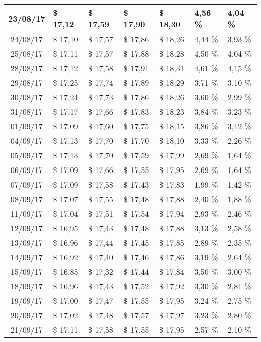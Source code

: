 \begin{center}
\begin{longtable}{|c|p{1.5cm}|p{1.5cm}|p{1.5cm}|p{1.5cm}|p{1.5cm}|p{1.5cm}|}
23/08/17 & \$ 17,12 & \$ 17,59 & \$ 17,90 & \$ 18,30 & 4,56 \% & 4,04 \% \\ \hline
24/08/17 & \$ 17,10 & \$ 17,57 & \$ 17,86 & \$ 18,26 & 4,44 \% & 3,93 \% \\ \hline
25/08/17 & \$ 17,11 & \$ 17,57 & \$ 17,88 & \$ 18,28 & 4,50 \% & 4,04 \% \\ \hline
28/08/17 & \$ 17,12 & \$ 17,58 & \$ 17,91 & \$ 18,31 & 4,61 \% & 4,15 \% \\ \hline
29/08/17 & \$ 17,25 & \$ 17,74 & \$ 17,89 & \$ 18,29 & 3,71 \% & 3,10 \% \\ \hline
30/08/17 & \$ 17,24 & \$ 17,73 & \$ 17,86 & \$ 18,26 & 3,60 \% & 2,99 \% \\ \hline
31/08/17 & \$ 17,17 & \$ 17,66 & \$ 17,83 & \$ 18,23 & 3,84 \% & 3,23 \% \\ \hline
01/09/17 & \$ 17,09 & \$ 17,60 & \$ 17,75 & \$ 18,15 & 3,86 \% & 3,12 \% \\ \hline
04/09/17 & \$ 17,13 & \$ 17,70 & \$ 17,70 & \$ 18,10 & 3,33 \% & 2,26 \% \\ \hline
05/09/17 & \$ 17,13 & \$ 17,70 & \$ 17,59 & \$ 17,99 & 2,69 \% & 1,64 \% \\ \hline
06/09/17 & \$ 17,09 & \$ 17,66 & \$ 17,55 & \$ 17,95 & 2,69 \% & 1,64 \% \\ \hline
07/09/17 & \$ 17,09 & \$ 17,58 & \$ 17,43 & \$ 17,83 & 1,99 \% & 1,42 \% \\ \hline
08/09/17 & \$ 17,07 & \$ 17,55 & \$ 17,48 & \$ 17,88 & 2,40 \% & 1,88 \% \\ \hline
11/09/17 & \$ 17,04 & \$ 17,51 & \$ 17,54 & \$ 17,94 & 2,93 \% & 2,46 \% \\ \hline
12/09/17 & \$ 16,95 & \$ 17,43 & \$ 17,48 & \$ 17,88 & 3,13 \% & 2,58 \% \\ \hline
13/09/17 & \$ 16,96 & \$ 17,44 & \$ 17,45 & \$ 17,85 & 2,89 \% & 2,35 \% \\ \hline
14/09/17 & \$ 16,92 & \$ 17,40 & \$ 17,46 & \$ 17,86 & 3,19 \% & 2,64 \% \\ \hline
15/09/17 & \$ 16,85 & \$ 17,32 & \$ 17,44 & \$ 17,84 & 3,50 \% & 3,00 \% \\ \hline
18/09/17 & \$ 16,96 & \$ 17,43 & \$ 17,52 & \$ 17,92 & 3,30 \% & 2,81 \% \\ \hline
19/09/17 & \$ 17,00 & \$ 17,47 & \$ 17,55 & \$ 17,95 & 3,24 \% & 2,75 \% \\ \hline
20/09/17 & \$ 17,02 & \$ 17,48 & \$ 17,57 & \$ 17,97 & 3,23 \% & 2,80 \% \\ \hline
21/09/17 & \$ 17,11 & \$ 17,58 & \$ 17,55 & \$ 17,95 & 2,57 \% & 2,10 \% \\ \hline

\end{longtable}
\end{center}
